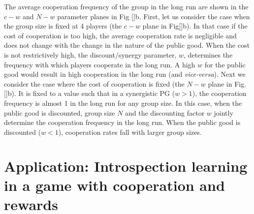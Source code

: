 \documentclass[11pt]{article}
\theoremstyle{plainCl1}
\theoremstyle{plainCl2}
\begin{document}
\noindent The average cooperation frequency of the group in the long run are shown in the $c-w$ and $N-w$ parameter planes in Fig \ref{}b. First, let us consider the case when the group size is fixed at 4 players (the $c-w$ plane in Fig\ref{}b). In that case if the cost of cooperation is too high, the average cooperation rate is negligible and does not change with the change in the nature of the public good. When the cost is not restrictively high, the discount/synergy parameter, $w$, determines the frequency with which players cooperate in the long run. A high $w$ for the public good would result in high cooperation in the long run (and \emph{vice-versa}). Next we consider the case where the cost of cooperation is fixed (the $N-w$ plane in Fig. \ref{}b). It is fixed to a value such that in a synergistic PG ($w > 1$), the cooperation frequency is almost 1 in the long run for any group size. In this case, when the public good is discounted, group size $N$ and the discounting factor $w$ jointly determine the cooperation frequency in the long run. When the public good is discounted ($w < 1$), cooperation rates fall with larger group sizes. \\

\noindent 

\section*{Application: Introspection learning in a game with cooperation and rewards}
\end{document}
